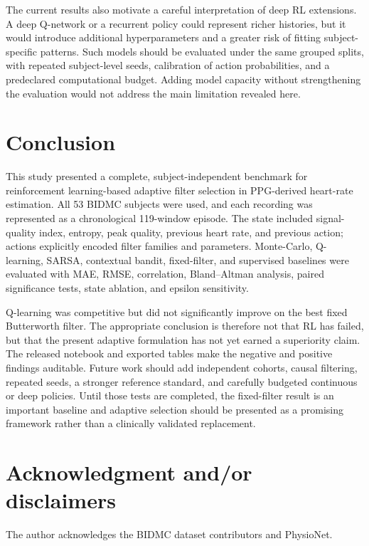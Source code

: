 \documentclass{elektr}
\begin{document}
The current results also motivate a careful interpretation of deep RL extensions. A deep Q-network or a recurrent policy could represent richer histories, but it would introduce additional hyperparameters and a greater risk of fitting subject-specific patterns. Such models should be evaluated under the same grouped splits, with repeated subject-level seeds, calibration of action probabilities, and a predeclared computational budget. Adding model capacity without strengthening the evaluation would not address the main limitation revealed here.

\section{Conclusion}

This study presented a complete, subject-independent benchmark for reinforcement learning-based adaptive filter selection in PPG-derived heart-rate estimation. All 53 BIDMC subjects were used, and each recording was represented as a chronological 119-window episode. The state included signal-quality index, entropy, peak quality, previous heart rate, and previous action; actions explicitly encoded filter families and parameters. Monte-Carlo, Q-learning, SARSA, contextual bandit, fixed-filter, and supervised baselines were evaluated with MAE, RMSE, correlation, Bland--Altman analysis, paired significance tests, state ablation, and epsilon sensitivity.

Q-learning was competitive but did not significantly improve on the best fixed Butterworth filter. The appropriate conclusion is therefore not that RL has failed, but that the present adaptive formulation has not yet earned a superiority claim. The released notebook and exported tables make the negative and positive findings auditable. Future work should add independent cohorts, causal filtering, repeated seeds, a stronger reference standard, and carefully budgeted continuous or deep policies. Until those tests are completed, the fixed-filter result is an important baseline and adaptive selection should be presented as a promising framework rather than a clinically validated replacement.

\section*{Acknowledgment and/or disclaimers}

The author acknowledges the BIDMC dataset contributors and PhysioNet.
\end{document}
